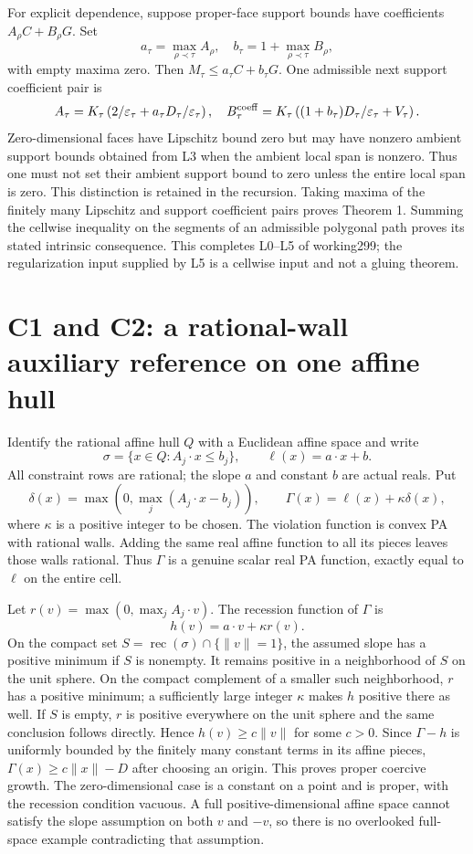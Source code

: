 \documentclass[
  11pt,
]{article}
\begin{document}
For explicit dependence, suppose proper-face support bounds have
coefficients \(A_\rho C+B_\rho G\). Set
\[ a_\tau=\max_{\rho\prec\tau} A_\rho,\quad
b_\tau=1+\max_{\rho\prec\tau}B_\rho, \] with empty maxima zero. Then
\(M_\tau\leq a_\tau C+b_\tau G\). One admissible next support
coefficient pair is \[
A_\tau=K_\tau\left(2/\varepsilon_\tau+a_\tau D_\tau/\varepsilon_\tau\right),
\quad B_\tau^{\rm coeff}=K_\tau\left((1+b_\tau)D_\tau/\varepsilon_\tau+V_\tau\right).
\] Zero-dimensional faces have Lipschitz bound zero but may have nonzero
ambient support bounds obtained from L3 when the ambient local span is
nonzero. Thus one must not set their ambient support bound to zero
unless the entire local span is zero. This distinction is retained in
the recursion. Taking maxima of the finitely many Lipschitz and support
coefficient pairs proves Theorem 1. Summing the cellwise inequality on
the segments of an admissible polygonal path proves its stated intrinsic
consequence. This completes L0--L5 of working299; the regularization
input supplied by L5 is a cellwise input and not a gluing theorem.

\section{C1 and C2: a rational-wall auxiliary reference on one affine
hull}\label{c1-and-c2-a-rational-wall-auxiliary-reference-on-one-affine-hull}

Identify the rational affine hull \(Q\) with a Euclidean affine space
and write \[ \sigma=\{x\in Q:A_j\cdot x\leq b_j\},\qquad
\ell(x)=a\cdot x+b. \] All constraint rows are rational; the slope \(a\)
and constant \(b\) are actual reals. Put
\[ \delta(x)=\max(0,\max_j(A_j\cdot x-b_j)),\qquad
\Gamma(x)=\ell(x)+\kappa\delta(x), \] where \(\kappa\) is a positive
integer to be chosen. The violation function is convex PA with rational
walls. Adding the same real affine function to all its pieces leaves
those walls rational. Thus \(\Gamma\) is a genuine scalar real PA
function, exactly equal to \(\ell\) on the entire cell.

Let \(r(v)=\max(0,\max_j A_j\cdot v)\). The recession function of
\(\Gamma\) is \[ h(v)=a\cdot v+\kappa r(v). \] On the compact set
\(S=\operatorname{rec}(\sigma)\cap\{\|v\|=1\}\), the assumed slope has a
positive minimum if \(S\) is nonempty. It remains positive in a
neighborhood of \(S\) on the unit sphere. On the compact complement of a
smaller such neighborhood, \(r\) has a positive minimum; a sufficiently
large integer \(\kappa\) makes \(h\) positive there as well. If \(S\) is
empty, \(r\) is positive everywhere on the unit sphere and the same
conclusion follows directly. Hence \(h(v)\geq c\|v\|\) for some \(c>0\).
Since \(\Gamma-h\) is uniformly bounded by the finitely many constant
terms in its affine pieces, \(\Gamma(x)\geq c\|x\|-D\) after choosing an
origin. This proves proper coercive growth. The zero-dimensional case is
a constant on a point and is proper, with the recession condition
vacuous. A full positive-dimensional affine space cannot satisfy the
slope assumption on both \(v\) and \(-v\), so there is no overlooked
full-space example contradicting that assumption.
\end{document}
